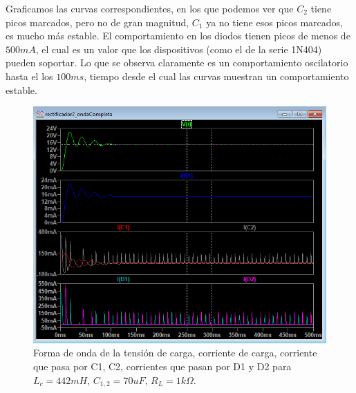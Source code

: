 \documentclass[a4paper]{IEEEtran} %
\begin{document}
Graficamos las curvas correspondientes, en los que podemos ver que $C_2$ tiene picos marcados, pero no de gran magnitud, $C_1$ ya no tiene esos picos marcados, es mucho más estable. El comportamiento en los diodos tienen picos de menos de $500mA$, el cual es un valor que los dispositivos (como el de la serie 1N404) pueden soportar. Lo que se observa claramente es un comportamiento oscilatorio hasta el los $100ms$, tiempo desde el cual las curvas muestran un comportamiento estable. 

\begin{figure}[!h]
	\centering
	\includegraphics[scale=0.5]{IMAGENES/a83}
	\caption{Forma de onda de la tensión de carga, corriente de carga, corriente que pasa por C1, C2, corrientes que pasan por D1 y D2 para $L_c = 442mH$, $C_{1,2} = 70uF$, $R_L = 1k\Omega$.}
	\label{a83}
\end{figure}
\end{document}
